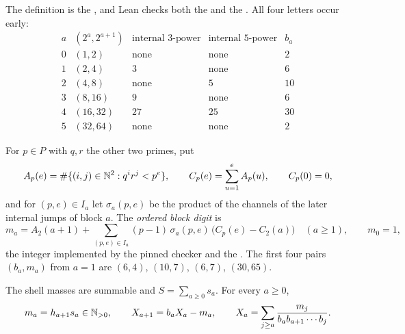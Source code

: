 \documentclass[11pt]{article}
\begin{document}
\noindent The definition is the
, and Lean checks both the
 and the
.  All four letters occur early:
\[
\begin{array}{c|c|c|c|c}
a & (2^{a},2^{a+1}) & \text{internal }3\text{-power} & \text{internal }5\text{-power} & b_a\\ \hline
0 & (1,2)   & \text{none} & \text{none} & 2\\
1 & (2,4)   & 3           & \text{none} & 6\\
2 & (4,8)   & \text{none} & 5           & 10\\
3 & (8,16)  & 9           & \text{none} & 6\\
4 & (16,32) & 27          & 25          & 30\\
5 & (32,64) & \text{none} & \text{none} & 2
\end{array}
\]

For $p\in P$ with $q,r$ the other two primes, put
\[
 A_p(e)=\#\{(i,j)\in\mathbb{N}^2:q^{i}r^{j}<p^{e}\},\qquad
 C_p(e)=\sum_{u=1}^{e}A_p(u),\qquad C_p(0)=0 ,
\]
and for $(p,e)\in I_a$ let $\sigma_a(p,e)$ be the product of the channels of
the later internal jumps of block $a$.  The \emph{ordered block digit} is
\begin{equation}\label{long269:eq:actual-digit}
 m_a=A_2(a+1)+\sum_{(p,e)\in I_a}(p-1)\,\sigma_a(p,e)\,
        \bigl(C_p(e)-C_2(a)\bigr)\quad(a\ge1),
 \qquad m_0=1 ,
\end{equation}
the integer implemented by the pinned checker and the
.  The first four pairs $(b_a,m_a)$ from $a=1$ are
$(6,4)$, $(10,7)$, $(6,7)$, $(30,65)$.

\begin{theorem}\label{long269:res:actual-orbit}
The shell masses are summable and $S=\sum_{a\ge0}s_a$.  For every $a\ge0$,
\begin{equation}\label{long269:eq:shell-digit-identity}
 m_a=h_{a+1}s_a\in\mathbb{N}_{>0},
 \qquad
 X_{a+1}=b_aX_a-m_a,
 \qquad
 X_a=\sum_{j\ge a}\frac{m_j}{b_ab_{a+1}\cdots b_j} .
\end{equation}
\end{theorem}
\end{document}
